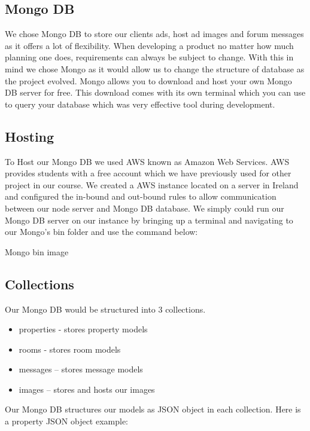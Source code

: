 \subsection{Mongo DB}

We chose Mongo DB to store our clients ads, host ad images and forum messages as it offers a lot of flexibility. When developing a product no matter how much planning one does, requirements can always be subject to change. With this in mind we chose Mongo as it would allow us to change the structure of database as the project evolved. Mongo allows you to download and host your own Mongo DB server for free. This download comes with its own terminal which you can use to query your database which was very effective tool during development.

\subsection{Hosting}

To Host our Mongo DB we used AWS known as Amazon Web Services. AWS provides students with a free account which we have previously used for other project in our course. We created a AWS instance located on a server in Ireland and configured the in-bound and out-bound rules to allow communication between our node server and Mongo DB database. We simply could run our Mongo DB server on our instance by bringing up a terminal and navigating to our Mongo’s bin folder and use the command below:

Mongo bin image 

\subsection{Collections}

Our Mongo DB would be structured into 3 collections.
\begin{itemize}
    \item properties - stores property models 
    \item rooms - stores room models
    \item messages – stores message models 
    \item images – stores and hosts our images
\end{itemize}


Our Mongo DB structures our models as JSON object in each collection. Here is a property JSON object example:

